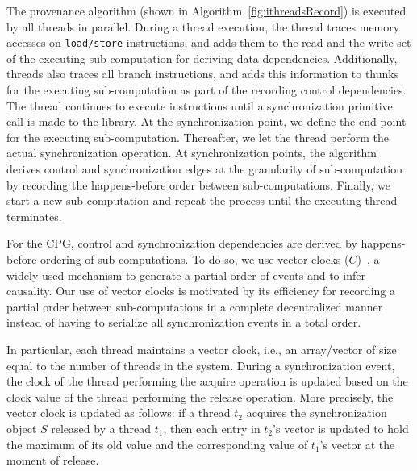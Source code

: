    The provenance algorithm (shown in Algorithm~\ref{fig:ithreadsRecord}) is executed by all threads in parallel. During a thread execution, the thread traces memory accesses on {\tt load/store} instructions, and adds them to the read and
the write set of the executing sub-computation for deriving data dependencies. Additionally, threads also traces all branch instructions, and adds this information to thunks for the executing sub-computation as part of the recording control dependencies.
The thread continues to execute instructions until a synchronization primitive call is made to the \pthreads  library. At the synchronization point, we define the end point for the executing sub-computation. 
Thereafter, we let the thread perform the actual synchronization operation. At synchronization points, the algorithm derives control  and synchronization edges at the granularity of sub-computation by recording the happens-before order between sub-computations. Finally, we start a new sub-computation and repeat the process until the executing thread
terminates. 



 


   
   
  



 
 

 For the CPG, control and synchronization dependencies are derived by 
happens-before ordering of sub-computations. To do so, we use vector clocks
($C$)~\cite{Mattern89virtualtime},  a widely used mechanism to generate a partial order of events and to infer causality. Our use of vector
clocks is motivated by its efficiency for recording a partial order between sub-computations in a complete decentralized manner instead of having to serialize all synchronization events in a total order.

In particular, each thread maintains a vector clock, i.e., an array/vector of size equal to the number of threads in the system.  
During a synchronization event, the clock of the thread performing the
acquire operation is updated based on the clock value of the thread performing
the release operation.  More precisely, the vector clock is updated as follows: if a thread $t_2$ acquires the synchronization
object $S$ released by a thread $t_1$, then each entry in $t_2$'s vector is
updated to hold the maximum of its old value and the corresponding value of
$t_1$'s vector at the moment of release.



